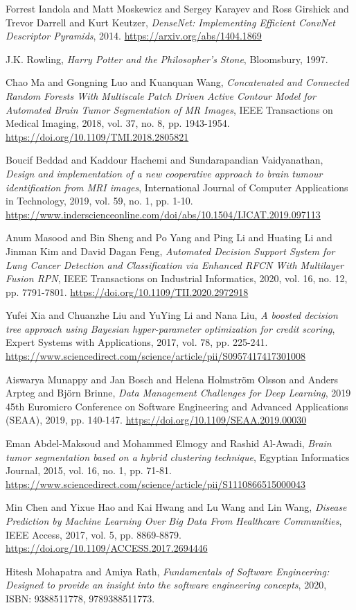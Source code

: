 \documentclass[conference]{IEEEtran}
\begin{document}
\begin{thebibliography}{00}
Forrest Iandola and Matt Moskewicz and Sergey Karayev and Ross Girshick and Trevor Darrell and Kurt Keutzer,
\emph{DenseNet: Implementing Efficient ConvNet Descriptor Pyramids},
2014.
\url{https://arxiv.org/abs/1404.1869}

J.K. Rowling,
\emph{Harry Potter and the Philosopher's Stone},
Bloomsbury,
1997.

Chao Ma and Gongning Luo and Kuanquan Wang,
\emph{Concatenated and Connected Random Forests With Multiscale Patch Driven Active Contour Model for Automated Brain Tumor Segmentation of MR Images},
IEEE Transactions on Medical Imaging,
2018,
vol. 37, no. 8, pp. 1943-1954.
\url{https://doi.org/10.1109/TMI.2018.2805821}

Boucif Beddad and Kaddour Hachemi and Sundarapandian Vaidyanathan,
\emph{Design and implementation of a new cooperative approach to brain tumour identification from MRI images},
International Journal of Computer Applications in Technology,
2019,
vol. 59, no. 1, pp. 1-10.
\url{https://www.inderscienceonline.com/doi/abs/10.1504/IJCAT.2019.097113}

Anum Masood and Bin Sheng and Po Yang and Ping Li and Huating Li and Jinman Kim and David Dagan Feng,
\emph{Automated Decision Support System for Lung Cancer Detection and Classification via Enhanced RFCN With Multilayer Fusion RPN},
IEEE Transactions on Industrial Informatics,
2020,
vol. 16, no. 12, pp. 7791-7801.
\url{https://doi.org/10.1109/TII.2020.2972918}

Yufei Xia and Chuanzhe Liu and YuYing Li and Nana Liu,
\emph{A boosted decision tree approach using Bayesian hyper-parameter optimization for credit scoring},
Expert Systems with Applications,
2017,
vol. 78, pp. 225-241.
\url{https://www.sciencedirect.com/science/article/pii/S0957417417301008}

Aiswarya Munappy and Jan Bosch and Helena Holmström Olsson and Anders Arpteg and Björn Brinne,
\emph{Data Management Challenges for Deep Learning},
2019 45th Euromicro Conference on Software Engineering and Advanced Applications (SEAA),
2019,
pp. 140-147.
\url{https://doi.org/10.1109/SEAA.2019.00030}

Eman Abdel-Maksoud and Mohammed Elmogy and Rashid Al-Awadi,
\emph{Brain tumor segmentation based on a hybrid clustering technique},
Egyptian Informatics Journal,
2015,
vol. 16, no. 1, pp. 71-81.
\url{https://www.sciencedirect.com/science/article/pii/S1110866515000043}

Min Chen and Yixue Hao and Kai Hwang and Lu Wang and Lin Wang,
\emph{Disease Prediction by Machine Learning Over Big Data From Healthcare Communities},
IEEE Access,
2017,
vol. 5, pp. 8869-8879.
\url{https://doi.org/10.1109/ACCESS.2017.2694446}

Hitesh Mohapatra and Amiya Rath,
\emph{Fundamentals of Software Engineering: Designed to provide an insight into the software engineering concepts},
2020,
ISBN: 9388511778, 9789388511773.

\end{thebibliography}
\end{document}
